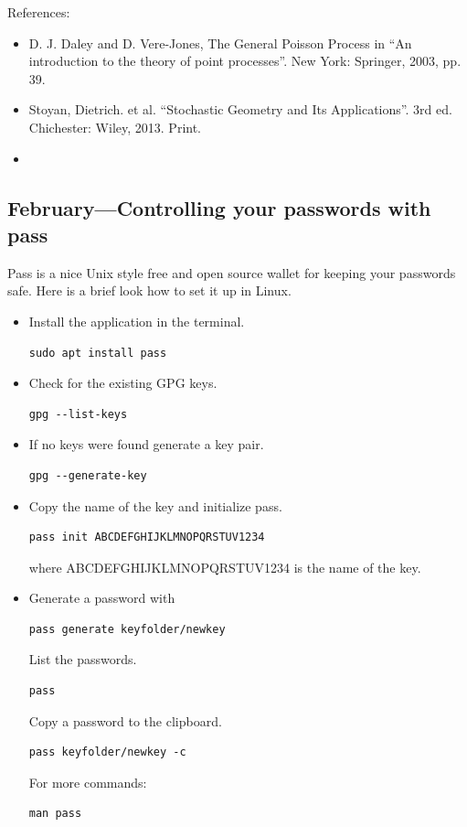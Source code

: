 \documentclass{article}
\begin{document}
References:
\begin{itemize}
\item D. J. Daley and D. Vere-Jones, The General Poisson Process in  ``An introduction to the theory of point processes''. New York: Springer, 2003, pp. 39. 
\item Stoyan, Dietrich. et al. ``Stochastic Geometry and Its Applications''. 3rd ed. Chichester: Wiley, 2013. Print.
\item  {}
\end{itemize}




\subsection{February---Controlling your passwords with pass}
Pass is a nice Unix style free and open source wallet for keeping your passwords safe. Here is a brief look how to set it up in Linux.

\begin{itemize}
\item Install the application in the terminal. \\
\begin{verbatim}
sudo apt install pass  
\end{verbatim}
\item Check for the existing GPG keys. \\
\begin{verbatim}
gpg --list-keys 
\end{verbatim}
\item If no keys were found generate a key pair. \\
\begin{verbatim}
gpg --generate-key
\end{verbatim}
\item Copy the name of the key and initialize pass.\\
\begin{verbatim}
pass init ABCDEFGHIJKLMNOPQRSTUV1234
\end{verbatim}
where ABCDEFGHIJKLMNOPQRSTUV1234 is the name of the key.
\item Generate a password with \\
\begin{verbatim}
pass generate keyfolder/newkey 
\end{verbatim}
List the passwords.
\begin{verbatim}
pass
\end{verbatim}
Copy a password to the clipboard. \\
\begin{verbatim}
pass keyfolder/newkey -c
\end{verbatim}
For more commands:
\begin{verbatim}
man pass
\end{verbatim}
\end{itemize}
\end{document}
